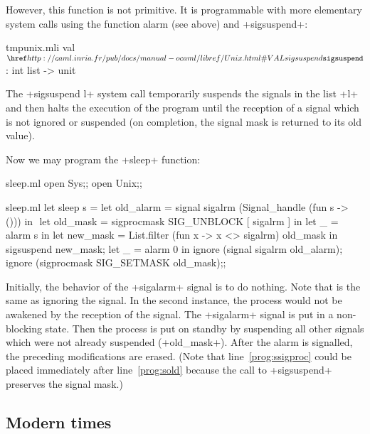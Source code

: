 However, this function is not primitive. It is programmable with 
more elementary system calls using the function alarm (see 
above) and \ml+sigsuspend+: 

%
\begin{listingcodefile}{tmpunix.mli}
val $\libvalue{Unix}{sigsuspend}$ : int list -> unit
\end{listingcodefile}
%

The \ml+sigsuspend l+ system call temporarily suspends the signals in the 
list \ml+l+ and then halts the execution of the program until the reception 
of a signal which is not ignored or suspended (on completion, the 
signal mask is returned to its old value).

\begin{example}

Now we may program the \ml+sleep+ function:
%
\begin{codefile}{sleep.ml}
open Sys;;
open Unix;;
\end{codefile}
%
\begin{listingcodefile}[style=numbers]{sleep.ml}
let sleep s = 
  let old_alarm = signal sigalrm (Signal_handle (fun s -> ())) in $\label{prog:sold}$
  let old_mask = sigprocmask SIG_UNBLOCK [ sigalrm ] in
  let _ = alarm s in
  let new_mask = List.filter (fun x -> x <> sigalrm) old_mask in
  sigsuspend new_mask; 
  let _ = alarm 0 in
  ignore (signal sigalrm old_alarm); 
  ignore (sigprocmask SIG_SETMASK old_mask)$\label{prog:ssigproc}$;;
\end{listingcodefile}
%

Initially, the behavior of the \ml+sigalarm+ signal is to do nothing.  Note
that  is the same as ignoring the signal.  In
the second instance, the process would not be awakened by the reception
of the signal. The \ml+sigalarm+ signal is put in a non-blocking
state.  Then the process is put on standby by suspending all other
signals which were not already suspended (\ml+old_mask+). After the alarm
is signalled, the preceding modifications are erased. (Note that
line~\ref{prog:ssigproc} could be placed immediately after
line~\ref{prog:sold} because the call to \ml+sigsuspend+ preserves
the signal mask.)

\end{example}

\subsection*{Modern times}

